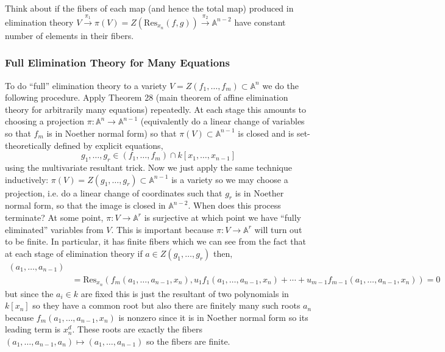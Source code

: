\documentclass[12pt]{article}
\newcommand{\A}{\mathbb{A}}
\renewcommand{\Res}{\mathrm{Res}}
\begin{document}
\begin{rmk}
Think about if the fibers of each map (and hence the total map) produced in elimination theory $V \xrightarrow{\pi_1} \pi(V) = Z(\Res_{x_n}(f,g)) \xrightarrow{\pi_2} \A^{n-2}$ have constant number of elements in their fibers.
\end{rmk}

\subsubsection{Full Elimination Theory for Many Equations}

To do ``full'' elimination theory to a variety $V = Z(f_1, \dots, f_m) \subset \A^n$ we do the following procedure. Apply Theorem 28 (main theorem of affine elimination theory for arbitrarily many equations) repeatedly. At each stage this amounts to choosing a projection $\pi : \A^n \to \A^{n-1}$ (equivalently do a linear change of variables so that $f_m$ is in Noether normal form) so that $\pi(V) \subset \A^{n-1}$ is closed and is set-theoretically defined by explicit equations,
\[ g_1, \dots, g_r \in (f_1, \dots, f_m) \cap k[x_1, \dots, x_{n-1}] \]
using the multivariate resultant trick. Now we just apply the same technique inductively: $\pi(V) = Z(g_1, \dots, g_r) \subset \A^{n-1}$ is a variety so we may choose a projection, i.e. do a linear change of coordinates such that $g_r$ is in Noether normal form, so that the image is closed in $\A^{n-2}$. When does this process terminate? At some point, $\pi : V \to \A^r$ is surjective at which point we have ``fully eliminated'' variables from $V$. This is important because $\pi : V \to \A^r$ will turn out to be finite. In particular, it has finite fibers which we can see from the fact that at each stage of elimination theory if $a \in Z(g_1, \dots, g_r)$ then,
\begin{align*}
[\mathrm{Res}_{x_n} & (f_m, u_1 f_1 + \cdots + u_{m-1} f_{m-1})](a_1, \dots, a_{n-1}) 
\\
& = \mathrm{Res}_{x_n}(f_m(a_1, \dots, a_{n-1}, x_n), u_1 f_1(a_1, \dots, a_{n-1}, x_n) + \cdots + u_{m-1} f_{m-1}(a_1, \dots, a_{n-1}, x_n)) = 0
\end{align*}
but since the $a_i \in k$ are fixed this is just the resultant of two polynomials in $k[x_n]$ so they have a common root but also there are finitely many such roots $a_n$ because $f_m(a_1, \dots, a_{n-1}, x_n)$ is nonzero since it is in Noether normal form so its leading term is $x_n^d$. These roots are exactly the fibers $(a_1, \dots, a_{n-1}, a_n) \mapsto (a_1, \dots, a_{n-1})$ so the fibers are finite. 
\end{document}
